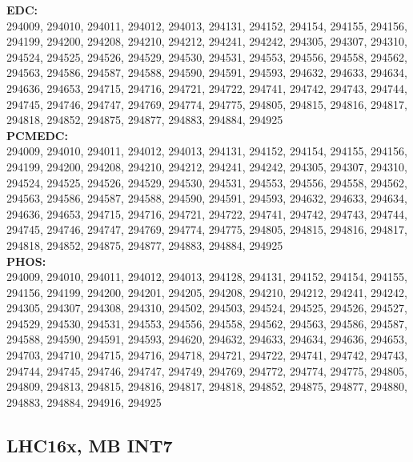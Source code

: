  \textbf{EDC:}\\
 294009, 294010, 294011, 294012, 294013, 294131, 294152, 294154, 294155, 294156, 294199, 294200, 294208, 294210, 294212, 294241, 294242, 294305, 294307, 294310, 294524, 294525, 294526, 294529, 294530, 294531, 294553, 294556, 294558, 294562, 294563, 294586, 294587, 294588, 294590, 294591, 294593, 294632, 294633, 294634, 294636, 294653, 294715, 294716, 294721, 294722, 294741, 294742, 294743, 294744, 294745, 294746, 294747, 294769, 294774, 294775, 294805, 294815, 294816, 294817, 294818, 294852, 294875, 294877, 294883, 294884, 294925\\

 \textbf{PCMEDC:}\\
294009, 294010, 294011, 294012, 294013, 294131, 294152, 294154, 294155, 294156, 294199, 294200, 294208, 294210, 294212, 294241, 294242, 294305, 294307, 294310, 294524, 294525, 294526, 294529, 294530, 294531, 294553, 294556, 294558, 294562, 294563, 294586, 294587, 294588, 294590, 294591, 294593, 294632, 294633, 294634, 294636, 294653, 294715, 294716, 294721, 294722, 294741, 294742, 294743, 294744, 294745, 294746, 294747, 294769, 294774, 294775, 294805, 294815, 294816, 294817, 294818, 294852, 294875, 294877, 294883, 294884, 294925\\

 \textbf{PHOS:}\\
294009, 294010, 294011, 294012, 294013, 294128, 294131, 294152, 294154, 294155, 294156, 294199, 294200, 294201, 294205, 294208, 294210, 294212, 294241, 294242, 294305, 294307, 294308, 294310, 294502, 294503, 294524, 294525, 294526, 294527, 294529, 294530, 294531, 294553, 294556, 294558, 294562, 294563, 294586, 294587, 294588, 294590, 294591, 294593, 294620, 294632, 294633, 294634, 294636, 294653, 294703, 294710, 294715, 294716, 294718, 294721, 294722, 294741, 294742, 294743, 294744, 294745, 294746, 294747, 294749, 294769, 294772, 294774, 294775, 294805, 294809, 294813, 294815, 294816, 294817, 294818, 294852, 294875, 294877, 294880, 294883, 294884, 294916, 294925\\

%
%

\subsection{LHC16x, MB INT7}
\label{subsec:goodRuns16}

